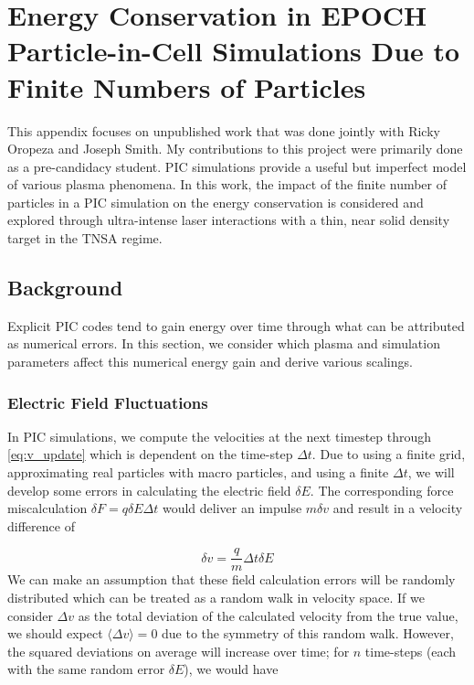 \chapter{Energy Conservation in EPOCH Particle-in-Cell Simulations Due to Finite Numbers of Particles}
This appendix focuses on unpublished work that was done jointly with Ricky Oropeza and Joseph Smith. My contributions to this project were primarily done as a pre-candidacy student. \gls{PIC} simulations provide a useful but imperfect model of various plasma phenomena. In this work, the impact of the finite number of particles in a PIC simulation on the energy conservation is considered and explored through ultra-intense laser interactions with a thin, near solid density target in the \gls{TNSA} regime. 

\section{Background}

Explicit PIC codes tend to gain energy over time through what can be attributed as numerical errors. In this section, we consider which plasma and simulation parameters affect this numerical energy gain and derive various scalings. 

\subsection{Electric Field Fluctuations}

In PIC simulations, we compute the velocities at the next timestep through \cref{eq:v_update} which is dependent on the time-step $\Delta t$. Due to using a finite grid, approximating real particles with macro particles, and using a finite $\Delta t$, we will develop some errors in calculating the electric field $\delta E$. The corresponding force miscalculation $\delta F = q \delta E \Delta t$ would deliver an impulse $m \delta v$ and result in a velocity difference \cite{Hockney_1988_PIC} of

\begin{equation}
	\delta v = \frac{q}{m} \Delta t \delta E
\end{equation}
We can make an assumption that these field calculation errors will be randomly distributed which can be treated as a random walk in velocity space. If we consider $\Delta v$ as the total deviation of the calculated velocity from the true value, we should expect $\langle \Delta v \rangle = 0$ due to the symmetry of this random walk. However, the squared deviations on average will increase over time; for $n$ time-steps (each with the same random error $\delta E$), we would have 

